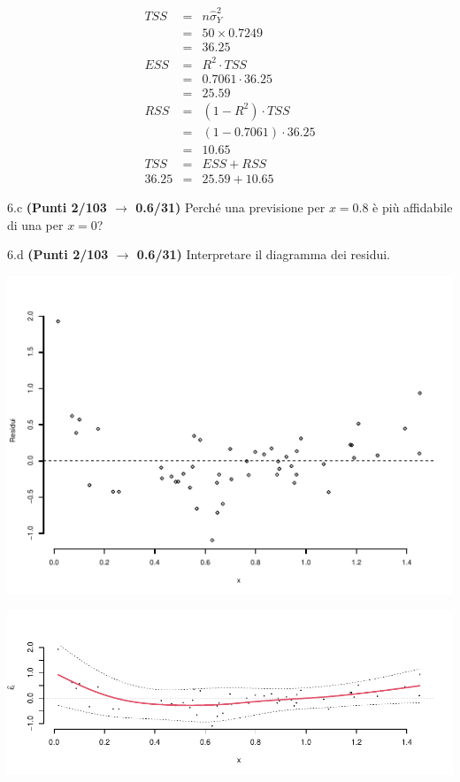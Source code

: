 \documentclass[
  11pt,
]{book}
\theoremstyle{mytheoremstyle}
\theoremstyle{mydefstyle}
\newenvironment{sol}
  {
  \begin{tcolorbox}[enhanced,breakable,arc=0.1mm,boxrule=1pt,colback=white,colframe=iblue,
  title=\bf \fontfamily{lmss}\selectfont \hspace{.5 cm} Soluzione,drop fuzzy shadow]

}{
\end{tcolorbox}
  }
\begin{document}
\begin{sol}
\begin{eqnarray*}
   TSS &=& n\hat\sigma^2_Y\\
      &=& 50 \times 0.7249 \\
      &=&  36.25 \\
   ESS &=& R^2\cdot TSS\\
      &=&  0.7061 \cdot 36.25 \\
      &=& 25.59 \\
   RSS &=& (1-R^2)\cdot TSS\\
      &=& (1- 0.7061 )\cdot 36.25 \\
      &=&  10.65 \\
   TSS &=& ESS+RSS \\ 36.25  &=&  25.59 + 10.65 
  \end{eqnarray*}

\end{sol}

6.c \textbf{(Punti 2/103 \(\rightarrow\) 0.6/31)} Perché una previsione per \(x=0.8\) è più affidabile di una per \(x=0\)?

6.d \textbf{(Punti 2/103 \(\rightarrow\) 0.6/31)} Interpretare il diagramma dei residui.

\begin{center}\includegraphics{Esami_passati_con_soluzioni_files/figure-latex/2023-74,-1} \end{center}

\begin{sol}

\begin{center}\includegraphics{Esami_passati_con_soluzioni_files/figure-latex/2023-75,-1} \end{center}

\end{sol}
\end{document}

